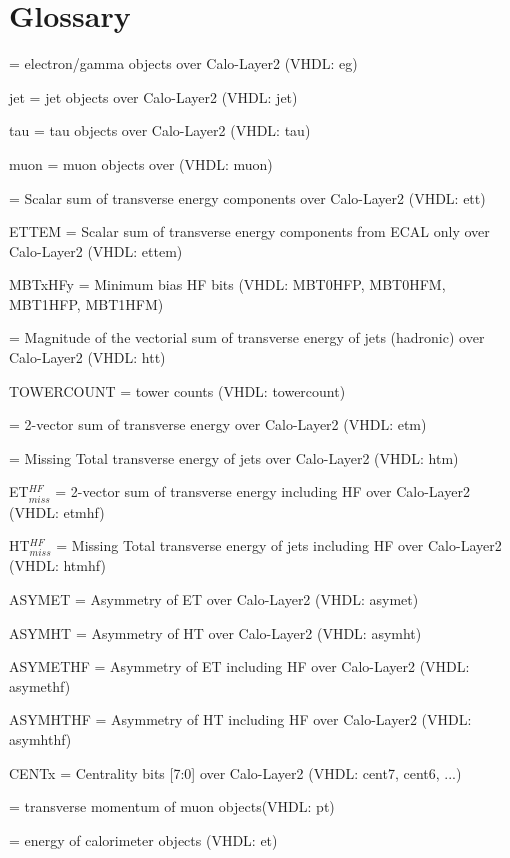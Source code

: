 \section{Glossary}\label{sec:glossary}

\begin{description}
\item {\egamma} = electron/gamma objects over Calo-Layer2 (VHDL: eg)
\item {jet} = jet objects over Calo-Layer2 (VHDL: jet)
\item {tau} = tau objects over Calo-Layer2 (VHDL: tau)
\item {muon} = muon objects over \ugmt (VHDL: muon)
\item {\ett} = Scalar sum of transverse energy components over Calo-Layer2 (VHDL: ett)
\item {ETTEM} = Scalar sum of transverse energy components from ECAL only over Calo-Layer2 (VHDL: ettem)
\item {MBTxHFy} = Minimum bias HF bits (VHDL: MBT0HFP, MBT0HFM, MBT1HFP, MBT1HFM)
\item {\htt} = Magnitude of the vectorial sum of transverse energy of jets (hadronic) over Calo-Layer2 (VHDL: htt)
\item {TOWERCOUNT} = tower counts (VHDL: towercount)
\item {\etm} = 2-vector sum of transverse energy over Calo-Layer2 (VHDL: etm)
\item {\htm} = Missing Total transverse energy of jets over Calo-Layer2 (VHDL: htm)
\item {ET$_{miss}^{HF}$} = 2-vector sum of transverse energy including HF over Calo-Layer2 (VHDL: etmhf)
\item {HT$_{miss}^{HF}$} = Missing Total transverse energy of jets including HF over Calo-Layer2 (VHDL: htmhf)
\item {ASYMET} = Asymmetry of ET over Calo-Layer2 (VHDL: asymet)
\item {ASYMHT} = Asymmetry of HT over Calo-Layer2 (VHDL: asymht)
\item {ASYMETHF} = Asymmetry of ET including HF over Calo-Layer2 (VHDL: asymethf)
\item {ASYMHTHF} = Asymmetry of HT including HF over Calo-Layer2 (VHDL: asymhthf)
\item {CENTx} = Centrality bits [7:0] over Calo-Layer2 (VHDL: cent7, cent6, ...)
\item {\pt} = transverse momentum of muon objects(VHDL: pt)
\item {\et} = energy of calorimeter objects (VHDL: et)

\end{description}
